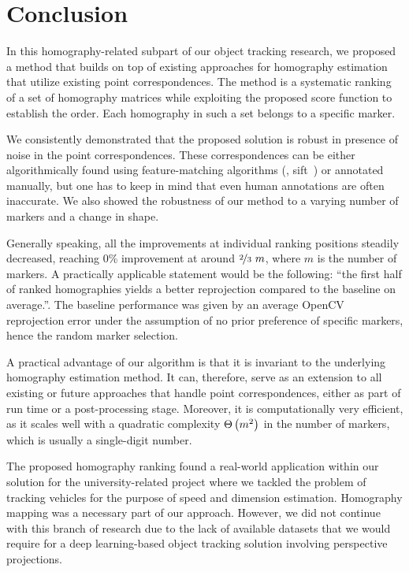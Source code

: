 \section{Conclusion}

In this homography-related subpart of our object tracking research, we proposed a method that builds on top of existing approaches for homography estimation that utilize existing point correspondences. The method is a systematic ranking of a set of homography matrices while exploiting the proposed score function to establish the order. Each homography in such a set belongs to a specific marker.

We consistently demonstrated that the proposed solution is robust in presence of noise in the point correspondences. These correspondences can be either algorithmically found using feature-matching algorithms (\egtext{}, \gls{sift}~\cite{lowel1999objrecognition}) or annotated manually, but one has to keep in mind that even human annotations are often inaccurate. We also showed the robustness of our method to a varying number of markers and a change in shape.

Generally speaking, all the improvements at individual ranking positions steadily decreased, reaching $0$\% improvement at around $\nicefrac{2}{3}~m$, where $m$ is the number of markers. A practically applicable statement would be the following: ``the first half of ranked homographies yields a better reprojection compared to the baseline on average.''. The baseline performance was given by an average OpenCV~\cite{bradski2008learning} reprojection error under the assumption of no prior preference of specific markers, hence the random marker selection.

A practical advantage of our algorithm is that it is invariant to the underlying homography estimation method. It can, therefore, serve as an extension to all existing or future approaches that handle point correspondences, either as part of run time or a post-processing stage. Moreover, it is computationally very efficient, as it scales well with a quadratic complexity ${\Theta} \left( m^2 \right)$ in the number of markers, which is usually a single-digit number.

The proposed homography ranking found a real-world application within our solution for the university-related \interreg{} project where we tackled the problem of tracking vehicles for the purpose of speed and dimension estimation. Homography mapping was a necessary part of our approach. However, we did not continue with this branch of research due to the lack of available datasets that we would require for a deep learning-based object tracking solution involving perspective projections.
